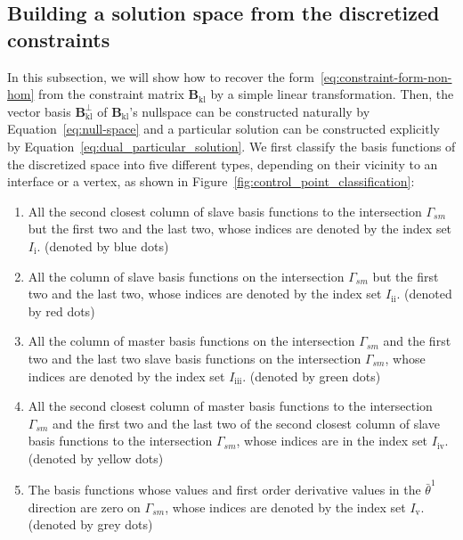 \subsection{Building a solution space from the discretized constraints}

In this subsection, we will show how to recover the form~\eqref{eq:constraint-form-non-hom} from the constraint matrix $\mathbf{B}_\text{kl}$ by a simple linear transformation. Then, the vector basis $\mathbf{B}^\perp_\text{kl}$ of $\mathbf{B}_\text{kl}$'s nullspace can be constructed naturally by Equation~\eqref{eq:null-space} and a particular solution can be constructed explicitly by Equation~\eqref{eq:dual_particular_solution}. We first classify the basis functions of the discretized space into five different types, depending on their vicinity to an interface or a vertex, as shown in Figure~\ref{fig:control_point_classification}:
\begin{enumerate}
	\item All the second closest column of slave basis functions to the intersection $\Gamma_{sm}$ but the first two and the last two, whose indices are denoted by the index set $I_\text{i}$. (denoted by blue dots)
	\item All the column of slave basis functions on the intersection $\Gamma_{sm}$ but the first two and the last two, whose indices are denoted by the index set $I_\text{ii}$. (denoted by red dots)
	\item All the column of master basis functions on the intersection $\Gamma_{sm}$ and the first two and the last two slave basis functions on the intersection $\Gamma_{sm}$, whose indices are denoted by the index set $I_\text{iii}$. (denoted by green dots)
	\item All the second closest column of master basis functions to the intersection $\Gamma_{sm}$ and the first two and the last two of the second closest column of slave basis functions to the intersection $\Gamma_{sm}$, whose indices are in the index set $I_\text{iv}$. (denoted by yellow dots)
	\item The basis functions whose values and first order derivative values in the $\bar{\theta}^1$ direction are zero on $\Gamma_{sm}$, whose indices are denoted by the index set $I_\text{v}$. (denoted by grey dots)
\end{enumerate}\par

